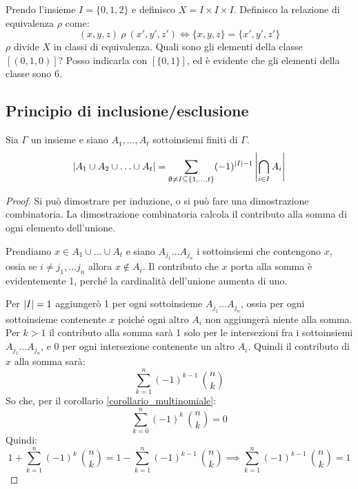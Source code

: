 \begin{exmp}
Prendo l'insieme $I = \{ 0, 1, 2 \}$ e definisco $X = I \times I \times I$. Definisco la relazione di equivalenza $\rho$ come:
\[
(x, y, z) \ \rho \ (x', y', z') \iff \{ x, y, z \} = \{ x', y', z'\}
\]
$\rho$ divide $X$ in classi di equivalenza. Quali sono gli elementi della classe $[(0,1,0)]$? Posso indicarla con $[\{0,1\}]$, ed \`e evidente che gli elementi della classe sono 6.
\end{exmp}

\subsection{Principio di inclusione/esclusione}

\begin{prop}
Sia $\Gamma$ un insieme e siano $A_1, \dots, A_t$ sottoinsiemi finiti di $\Gamma$.
\begin{equation}
\left\lvert{A_1 \cup A_2 \cup \ldots \cup A_t}\right\rvert  = 
\sum_{\emptyset \neq I \subseteq \{ 1, \ldots, t \}} (-1)^{\left\lvert{I}\right\rvert - 1} \left\lvert{\bigcap_{i \in I} A_i}\right\rvert 
\end{equation}
\end{prop}
\begin{proof}
Si pu\`o dimostrare per induzione, o si pu\`o fare una dimostrazione combinatoria. La dimostrazione combinatoria calcola il contributo alla somma di ogni elemento dell'unione.

Prendiamo $x \in A_1 \cup \dots \cup A_t$ e siano $A_{j_1} \dots A_{j_n}$ i sottoinsiemi che contengono $x$, ossia se $i \neq j_1 , \dots j_n$ allora $x \notin A_i$. Il contributo che $x$ porta alla somma \`e evidentemente 1, perch\'e la cardinalit\`a dell'unione aumenta di uno.

Per $\left\lvert{I}\right\rvert = 1$ aggiunger\`o 1 per ogni sottoinsieme $A_{j_1} \dots A_{j_n}$, ossia per ogni sottoinsieme contenente $x$ poich\'e ogni altro $A_i$ non aggiunger\`a niente alla somma. Per $k > 1$ il contributo alla somma sar\`a 1 solo per le intersezioni fra i sottoinsiemi $A_{j_1} \dots A_{j_n}$, e 0 per ogni intersezione contenente un altro $A_i$. Quindi il contributo di $x$ alla somma sar\`a:
\[
\sum_{k = 1}^{n} (-1)^{k - 1} \ \binom{n}{k}
\]
So che, per il corollario \ref{corollario_multinomiale}:
\[
\sum_{k = 0}^{n} (-1)^k \ \binom{n}{k} = 0
\]
Quindi:
\[
1 + \sum_{k = 1}^{n} (-1)^{k} \ \binom{n}{k} = 
1 - \sum_{k = 1}^{n} (-1)^{k - 1} \ \binom{n}{k} \implies
\sum_{k = 1}^{n} (-1)^{k - 1} \ \binom{n}{k} = 1
\]
\end{proof}

